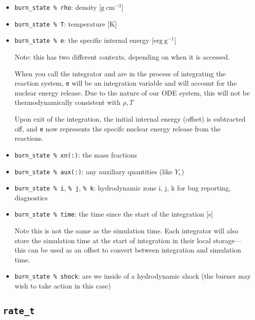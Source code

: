 \begin{itemize}
\item {\tt burn\_state \% rho}: density [$\mathrm{g~cm^{-3}}$]

\item {\tt burn\_state \% T}: temperature [K]

\item {\tt burn\_state \% e}: the specific internal energy [$\mathrm{erg~g^{-1}}$]

  Note: this has two different contexts, depending on when it is
  accessed.

  When you call the integrator and are in the process of integrating
  the reaction system, {\tt e} will be an integration variable and
  will account for the nuclear energy release.  Due to the nature 
  of our ODE system, this will not be thermodynamically consistent with
  $\rho, T$

  Upon exit of the integration, the initial internal energy (offset)
  is subtracted off, and {\tt e} now represents the specifc nuclear
  energy release from the reactions.
  

\item {\tt burn\_state \% xn(:)}: the mass fractions

\item {\tt burn\_state \% aux(:)}: any auxiliary quantities (like $Y_e$)

\item {\tt burn\_state \% i}, {\tt \% j}, {\tt \% k}: hydrodynamic zone i, j, k for
  bug reporting, diagnostics

\item {\tt burn\_state \% time}: the time since the start of the
  integration [s]

  Note this is not the same as the simulation time.  Each integrator
  will also store the simulation time at the start of integration
  in their local storage---this can be used as an offset to convert
  between integration and simulation time.

\item {\tt burn\_state \% shock}: are we inside of a hydrodynamic shock (the burner
  may wish to take action in this case)

\end{itemize}


\subsection{{\tt rate\_t}}

